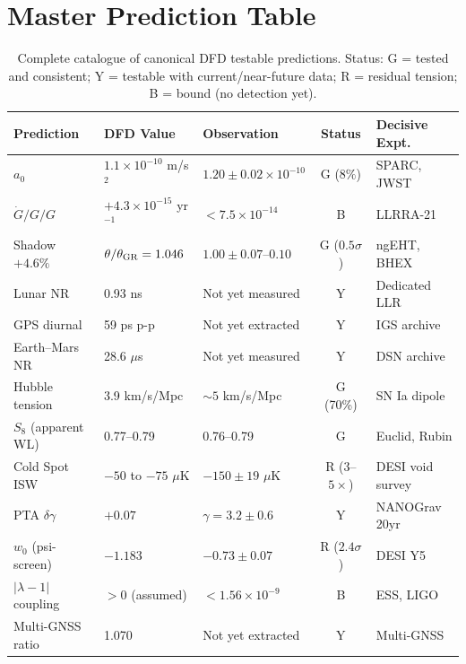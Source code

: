 \documentclass[11pt]{article}
\newcommand{\ee}[1]{\times 10^{#1}}
\newcommand{\Gdot}{\dot{G}/G}
\newcommand{\aM}{a_0}
\newcommand{\lamdiff}{|\lambda{-}1|}
\begin{document}
\section{Master Prediction Table}
\label{sec:master-table}

\begin{table}[H]
\centering
\small
\caption{Complete catalogue of canonical DFD testable predictions.
Status: G = tested and consistent; Y = testable with current/near-future
data; R = residual tension; B = bound (no detection yet).}
\label{tab:master}
\begin{tabular}{p{3cm}p{2.5cm}p{2.5cm}cp{2.5cm}}
\toprule
\textbf{Prediction} & \textbf{DFD Value} & \textbf{Observation} &
  \textbf{Status} & \textbf{Decisive Expt.} \\
\midrule
$\aM$ & $1.1\ee{-10}$ m/s$^2$ & $1.20\pm0.02\ee{-10}$ & G ($8\%$) & SPARC, JWST \\
$\Gdot/G$ & $+4.3\ee{-15}$ yr$^{-1}$ & $<7.5\ee{-14}$ & B & LLRRA-21 \\
Shadow $+4.6\%$ & $\theta/\theta_{\rm GR} = 1.046$ & $1.00\pm 0.07$--$0.10$ & G ($0.5\sigma$) & ngEHT, BHEX \\
Lunar NR & 0.93 ns & Not yet measured & Y & Dedicated LLR \\
GPS diurnal & 59 ps p-p & Not yet extracted & Y & IGS archive \\
Earth--Mars NR & 28.6 $\mu$s & Not yet measured & Y & DSN archive \\
Hubble tension & 3.9 km/s/Mpc & $\sim 5$ km/s/Mpc & G (70\%) & SN Ia dipole \\
$S_8$ (apparent WL) & 0.77--0.79 & 0.76--0.79 & G & Euclid, Rubin \\
Cold Spot ISW & $-50$ to $-75$ $\mu$K & $-150\pm19$ $\mu$K & R ($3$--$5\times$) & DESI void survey \\
PTA $\delta\gamma$ & $+0.07$ & $\gamma = 3.2\pm0.6$ & Y & NANOGrav 20yr \\
$w_0$ (psi-screen) & $-1.183$ & $-0.73\pm0.07$ & R ($2.4\sigma$) & DESI Y5 \\
$\lamdiff$ coupling & $>0$ (assumed) & $<1.56\ee{-9}$ & B & ESS, LIGO \\
Multi-GNSS ratio & 1.070 & Not yet extracted & Y & Multi-GNSS \\
\bottomrule
\end{tabular}
\end{table}
\end{document}
